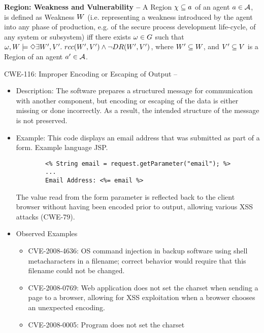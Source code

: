 \begin{definition}{\bf Region: Weakness and Vulnerability --}\label{def:weakness}
	A Region $\chi\subseteq a$ of an agent
	$a\in\mathcal{A}$, is defined as Weakness $W$ (i.e.
	representing a weakness introduced by the agent into any phase of
	production, e.g.  of the secure process development life-cycle, of any
	system or subsystem) iff there exists $\omega\in G$ such
	that $\omega,W\models\Diamond\exists W',V'.~
	rcc(W',V')\wedge\neg DR(W',V')$, 
	where $W'\subseteq W$, and
	$V'\subseteq V$ is a Region of an agent $a'\in\mathcal{A}$.
\end{definition}

\begin{example}{CWE-116: Improper Encoding or Escaping of Output\autocite{CWE-116} --}
	\begin{itemize} 
		\item Description: The software prepares a structured message
		for communication with another component, but encoding or
		escaping of the data is either missing or done incorrectly. As
		a result, the intended structure of the message is not
		preserved. 
		\item Example: This code displays an email
		address that was submitted as part of a form. Example language JSP.
		\begin{verbatim} 
		<% String email = request.getParameter("email"); %> 
		...
		Email Address: <%= email %>
		\end{verbatim}
		The value read from the form parameter is
		reflected back to the client browser without
		having been encoded prior to output, allowing
		various XSS attacks (CWE-79).
		\item Observed Examples
			\begin{itemize}
			\item CVE-2008-4636\autocite{CVE-2008-4636}: OS command injection in backup
				software using shell metacharacters in a
				filename; correct behavior would
				require that this filename could not be
				changed.
			\item CVE-2008-0769\autocite{CVE-2008-0769}: Web application does not set the
				charset when sending a page to a browser,
				allowing for XSS exploitation when a
				browser chooses an unexpected encoding.
			\item CVE-2008-0005\autocite{CVE-2008-0005}: Program does not set the charset

\end{itemize}
\end{itemize}
\end{example}
